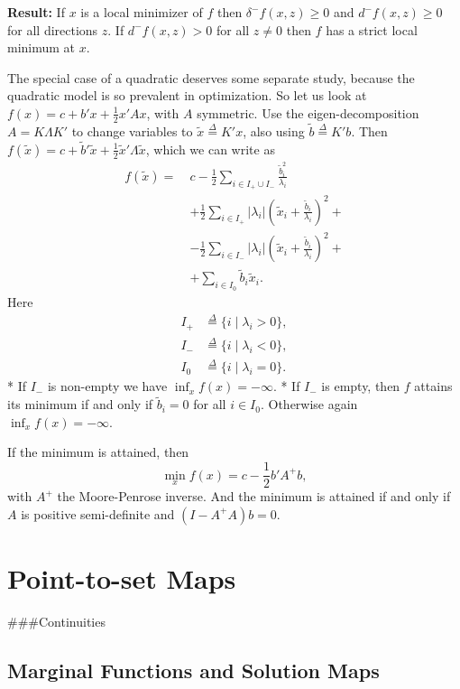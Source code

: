 \documentclass[
  12pt,
]{book}
\begin{document}
\textbf{Result:} If \(x\) is a local minimizer of \(f\) then \(\delta^-f(x,z)\geq 0\) and \(d^-f(x,z)\geq 0\) for all directions \(z\). If \(d^-f(x,z)>0\) for all \(z\not= 0\) then \(f\) has a strict local minimum at \(x\).

The special case of a quadratic deserves some separate study, because the quadratic model is so prevalent in optimization.
So let us look at \(f(x)=c+b'x+\frac12 x'Ax\), with \(A\) symmetric.
Use the eigen-decomposition \(A=K\Lambda K'\) to change variables to \(\tilde x\mathop{=}\limits^{\Delta}K'x\), also using \(\tilde b\mathop{=}\limits^{\Delta}K'b\). Then \(f(\tilde x)=c+\tilde b'\tilde x+\frac12\tilde x'\Lambda\tilde x\), which we can write as
\begin{align*}
f(\tilde x)=\ &c-\frac12\sum_{i\in I_+\cup I_-}\frac{\tilde b_i^2}{\lambda_i}\\
&+\frac12\sum_{i\in I_+}|\lambda_i|(\tilde x_i+\frac{\tilde b_i}{\lambda_i})^2+\\
&-\frac12\sum_{i\in I_-}|\lambda_i|(\tilde x_i+\frac{\tilde b_i}{\lambda_i})^2+\\
&+\sum_{i\in I_0}\tilde b_i\tilde x_i.
\end{align*}
Here
\begin{align*}
I_+&\mathop{=}\limits^{\Delta}\{i\mid\lambda_i>0\},\\
I_-&\mathop{=}\limits^{\Delta}\{i\mid\lambda_i<0\},\\
I_0&\mathop{=}\limits^{\Delta}\{i\mid\lambda_i=0\}.
\end{align*}
* If \(I_-\) is non-empty we have \(\inf_x f(x)=-\infty\).
* If \(I_-\) is empty, then \(f\)
attains its minimum if and only if \(\tilde b_i=0\) for all \(i\in I_0\). Otherwise again \(\inf_x f(x)=-\infty.\)

If the minimum is attained, then
\[
\min_x f(x) = c-\frac12 b'A^+b,
\]
with \(A^+\) the Moore-Penrose inverse. And the minimum is attained if and only if \(A\) is positive semi-definite and \((I-A^+A)b=0\).

\hypertarget{point-to-set-maps}{%
\section{Point-to-set Maps}\label{point-to-set-maps}}

\#\#\#Continuities

\hypertarget{marginal-functions-and-solution-maps}{%
\subsection{Marginal Functions and Solution Maps}\label{marginal-functions-and-solution-maps}}
\end{document}
